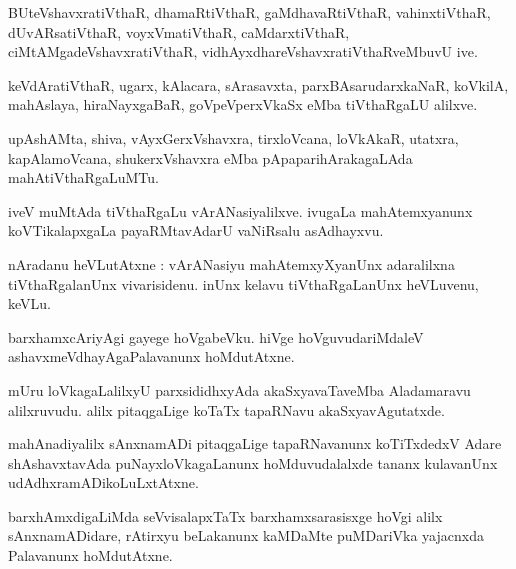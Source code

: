 \documentclass{article}
\begin{document}
\begin{mn}
BUteVshavxratiVthaR, dhamaRtiVthaR, gaMdhavaRtiVthaR, vahinxtiVthaR, dUvARsatiVthaR, voyxVmatiVthaR,
caMdarxtiVthaR, ciMtAMgadeVshavxratiVthaR, vidhAyxdhareVshavxratiVthaRveMbuvU ive.
\end{mn}

\begin{mn}
keVdAratiVthaR, ugarx, kAlacara, sArasavxta, parxBAsarudarxkaNaR, koVkilA, mahAslaya, 
hiraNayxgaBaR, goVpeVperxVkaSx eMba tiVthaRgaLU alilxve.
\end{mn}

\begin{mn}
upAshAMta, shiva, vAyxGerxVshavxra, tirxloVcana, loVkAkaR, utatxra, kapAlamoVcana, shukerxVshavxra 
eMba pApaparihArakagaLAda mahAtiVthaRgaLuMTu.
\end{mn}

\begin{mn}
iveV muMtAda tiVthaRgaLu vArANasiyalilxve. ivugaLa mahAtemxyanunx koVTikalapxgaLa payaRMtavAdarU 
vaNiRsalu asAdhayxvu.
\end{mn}


\begin{mn}
nAradanu heVLutAtxne : vArANasiyu mahAtemxyXyanUnx adaralilxna tiVthaRgalanUnx vivarisidenu. inUnx
kelavu tiVthaRgaLanUnx heVLuvenu, keVLu.
\end{mn}

\begin{mn}
barxhamxcAriyAgi gayege hoVgabeVku. hiVge hoVguvudariMdaleV ashavxmeVdhayAgaPalavanunx hoMdutAtxne.
\end{mn}

\begin{mn}
mUru loVkagaLalilxyU parxsididhxyAda akaSxyavaTaveMba Aladamaravu alilxruvudu. alilx pitaqgaLige 
koTaTx tapaRNavu akaSxyavAgutatxde.
\end{mn}

\begin{mn}
mahAnadiyalilx sAnxnamADi pitaqgaLige tapaRNavanunx  koTiTxdedxV Adare shAshavxtavAda 
puNayxloVkagaLanunx hoMduvudalalxde tananx kulavanUnx udAdhxramADikoLuLxtAtxne.
\end{mn}

\begin{mn}
barxhAmxdigaLiMda seVvisalapxTaTx barxhamxsarasisxge hoVgi alilx sAnxnamADidare, rAtirxyu 
beLakanunx kaMDaMte puMDariVka yajacnxda Palavanunx hoMdutAtxne.
\end{mn}
\end{document}
